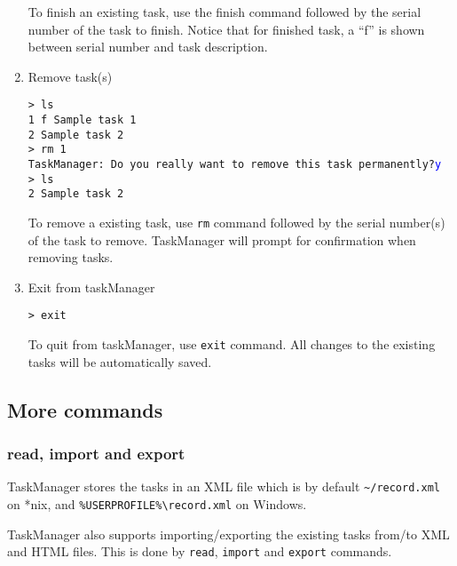\documentclass[12pt, a4paper]{article}
\begin{document}
\begin{enumerate}
To finish an existing task, use the finish command followed by the serial number of the task to finish. 
Notice that for finished task, a ``f'' is shown between serial number and task description.

\item Remove task(s)

\texttt{\textgreater \ ls\\
    1 f Sample task 1\\
    2   Sample task 2\\
    \textgreater \ rm 1\\
    TaskManager: Do you really want to remove this task permanently?\textcolor{blue}{y}\\
    \textgreater \ ls\\
    2   Sample task 2}

To remove a existing task, use \texttt{rm} command followed by the serial number(s) of the task to remove. TaskManager will prompt for confirmation when removing tasks.

\item Exit from taskManager

\texttt{\textgreater \ exit}

To quit from taskManager, use \texttt{exit} command. 
All changes to the existing tasks will be automatically saved.
\end{enumerate}

\subsection{More commands}
\subsubsection{read, import and export}

TaskManager stores the tasks in an XML file which is by default \texttt{\~{}/record.xml} on *nix, and \texttt{\%USERPROFILE\%\textbackslash record.xml} on Windows.

TaskManager also supports importing/exporting the existing tasks from/to XML and HTML files. This is done by \texttt{read}, \texttt{import} and \texttt{export} commands.
\end{document}
